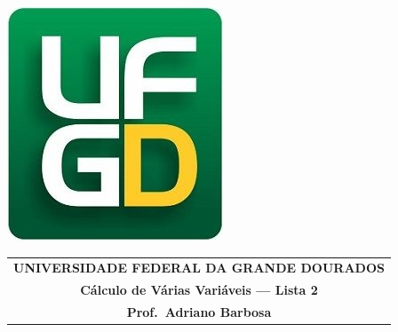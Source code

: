 \documentclass[a4paper,5pt]{amsbook}
\begin{document}
\thispagestyle{empty}
\pagestyle{empty}
\begin{minipage}[h]{0.14\textwidth}
	\includegraphics[scale=0.24]{../../ufgd.png}
\end{minipage}
\begin{minipage}[h]{\textwidth}
\begin{tabular}{c}
{{\bf UNIVERSIDADE FEDERAL DA GRANDE DOURADOS}}\\
{{\bf C\'alculo de V\'arias Vari\'aveis --- Lista 2}}\\
{{\bf Prof.\ Adriano Barbosa}}\\
\end{tabular}
\vspace{-0.45cm}
%
\end{minipage}

\end{document}
